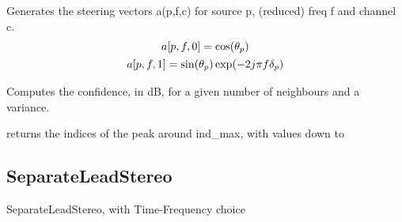 \documentclass[letterpaper,10pt,english]{sphinxmanual}
\begin{document}
\begin{fulllineitems}

\begin{fulllineitems}
\label{reference/demix:pyfasst.demixTF.DEMIX.steeringVectorsFromCentroids}
Generates the steering vectors a(p,f,c) for source p,
(reduced) freq f and channel c.
\begin{gather}
\begin{split}a[p,f,0] = \cos(\theta_p)\end{split}\notag\\\begin{split}a[p,f,1] = \sin(\theta_p) \exp(- 2 j \pi f \delta_p)\end{split}\notag
\end{gather}
\end{fulllineitems}


\end{fulllineitems}


\begin{fulllineitems}
\label{reference/demix:pyfasst.demixTF.confidenceFromVar}
Computes the confidence, in dB, for a given number of
neighbours and a variance.

\end{fulllineitems}


\begin{fulllineitems}
\label{reference/demix:pyfasst.demixTF.get_indices_peak}
returns the indices of the peak around ind\_max,
with values down to  

\end{fulllineitems}



\subsection{SeparateLeadStereo}
\label{reference/separateleadstereo:module-pyfasst.SeparateLeadStereo.SeparateLeadStereoTF}\label{reference/separateleadstereo:separateleadstereo}\label{reference/separateleadstereo::doc}
SeparateLeadStereo, with Time-Frequency choice
\end{document}

